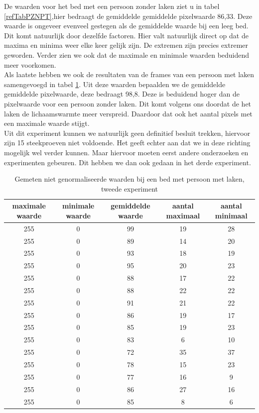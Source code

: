 De waarden voor het bed met een persoon zonder laken ziet u in tabel \ref{refTabPZNPT},hier bedraagt de gemiddelde gemiddelde pixelwaarde 86,33. Deze waarde is ongeveer evenveel gestegen als de gemiddelde waarde bij een leeg bed. Dit komt natuurlijk door dezelfde factoren. Hier valt natuurlijk direct op dat de maxima en minima weer elke keer gelijk zijn. De extremen zijn precies extremer geworden. Verder zien we ook dat de maximale en minimale waarden beduidend meer voorkomen. \\
Als laatste hebben we ook de resultaten van de frames van een persoon met laken samengevoegd in tabel \ref{refTabPZNPL}. Uit deze waarden bepaalden we de gemiddelde gemiddelde pixelwaarde, deze bedraagt 98,8. Deze is beduidend hoger dan de pixelwaarde voor een persoon zonder laken. Dit komt volgens ons doordat de het laken de lichaamswarmte meer verspreid. Daardoor dat ook het aantal pixels met een maximale waarde stijgt. \\
Uit dit experiment kunnen we natuurlijk geen definitief besluit trekken, hiervoor zijn 15 steekproeven niet voldoende. Het geeft echter aan dat we in deze richting mogelijk wel verder kunnen. Maar hiervoor moeten eerst andere onderzoeken en experimenten gebeuren. Dit hebben we dan ook gedaan in het derde experiment.
\begin{table}[hbp]
	\caption{Gemeten niet genormaliseerde waarden bij een bed met persoon met laken, tweede experiment}
	\begin{tabular}{|c|c|c|c|c|}
		\hline
		maximale waarde & minimale waarde & gemiddelde waarde & aantal maximaal & aantal minimaal \\ \hline
		255 & 0 & 99 & 19 & 28 \\ \hline
		255 & 0 & 89 & 14 & 20 \\ \hline
		255 & 0 & 93 & 18 & 19 \\ \hline
		255 & 0 & 95 & 20 & 23 \\ \hline
		255 & 0 & 88 & 17 & 22 \\ \hline
		255 & 0 & 88 & 22 & 22 \\ \hline
		255 & 0 & 91 & 21 & 22 \\ \hline
		255 & 0 & 86 & 19 & 17 \\ \hline
		255 & 0 & 85 & 19 & 23 \\ \hline
		255 & 0 & 83 & 6  & 10 \\ \hline
		255 & 0 & 72 & 35 & 37 \\ \hline
		255 & 0 & 78 & 15 & 23 \\ \hline
		255 & 0 & 77 & 16 & 9  \\ \hline
		255 & 0 & 86 & 27 & 16 \\ \hline
		255 & 0 & 85 & 8  & 6  \\ \hline
	\end{tabular}
	
	\label{refTabPZNPL}
\end{table}


